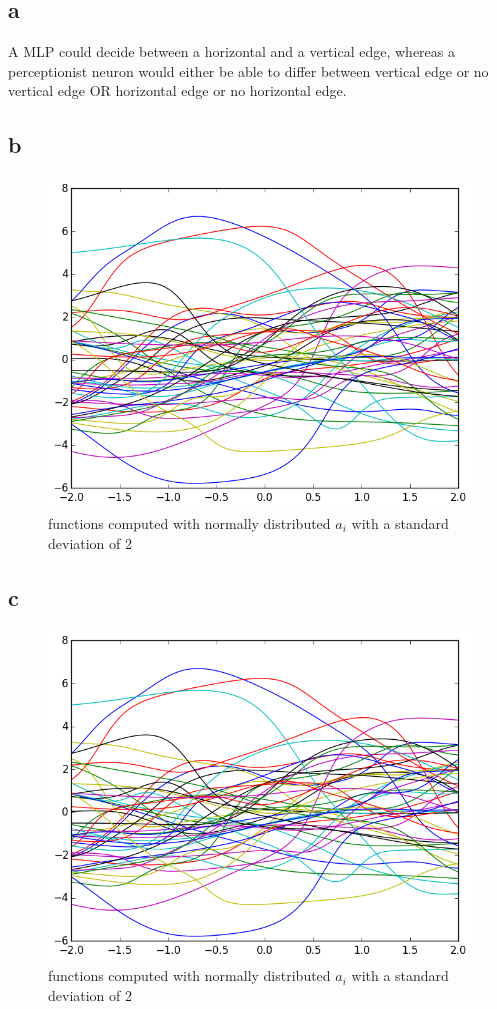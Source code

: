 \documentclass[11pt,a4paper]{article}
\begin{document}
\subsection*{a}
A MLP could decide between a horizontal and a vertical edge, whereas a perceptionist neuron would either be able to differ between
vertical edge or no vertical edge OR horizontal edge or no horizontal edge.
\subsection*{b}
\begin{figure}[h]
\centering
 \includegraphics[width=\textwidth]{./2_3_std=2.png}
\caption{functions computed with normally distributed $a_i$ with a standard deviation of 2}
\end{figure}
\newpage
\subsection*{c}
\begin{figure}[h]
\centering
 \includegraphics[width=\textwidth]{./2_3_std=2.png}
\caption{functions computed with normally distributed $a_i$ with a standard deviation of 2}
\end{figure}
\end{document}

